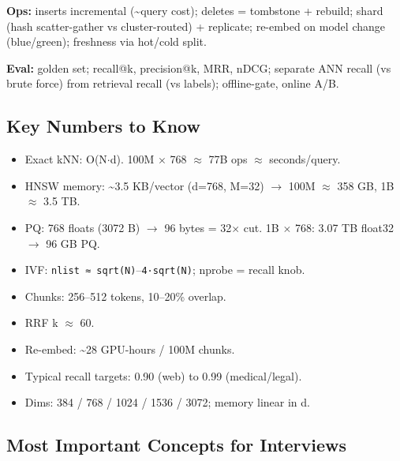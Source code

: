 \documentclass[11pt]{article}
\providecommand{\tightlist}{\setlength{\itemsep}{1pt}\setlength{\parskip}{0pt}}
\begin{document}
\textbf{Ops:} inserts incremental (\textasciitilde query cost); deletes = tombstone + rebuild; shard (hash scatter-gather vs cluster-routed) + replicate; re-embed on model change (blue/green); freshness via hot/cold split.

\textbf{Eval:} golden set; recall@k, precision@k, MRR, nDCG; separate ANN recall (vs brute force) from retrieval recall (vs labels); offline-gate, online A/B.

\subsection{Key Numbers to Know}\label{key-numbers-to-know}

\begin{itemize}
\tightlist
\item
  Exact kNN: O(N\(\cdot\)d). 100M \(\times\) 768 \(\approx\) 77B ops \(\approx\) seconds/query.
\item
  HNSW memory: \textasciitilde3.5 KB/vector (d=768, M=32) \(\rightarrow\) 100M \(\approx\) 358 GB, 1B \(\approx\) 3.5 TB.
\item
  PQ: 768 floats (3072 B) \(\rightarrow\) 96 bytes = 32\(\times\) cut. 1B \(\times\) 768: 3.07 TB float32 \(\rightarrow\) 96 GB PQ.
\item
  IVF: \texttt{nlist\ ≈\ sqrt(N)}--\texttt{4·sqrt(N)}; nprobe = recall knob.
\item
  Chunks: 256--512 tokens, 10--20\% overlap.
\item
  RRF k \(\approx\) 60.
\item
  Re-embed: \textasciitilde28 GPU-hours / 100M chunks.
\item
  Typical recall targets: 0.90 (web) to 0.99 (medical/legal).
\item
  Dims: 384 / 768 / 1024 / 1536 / 3072; memory linear in d.
\end{itemize}

\subsection{Most Important Concepts for Interviews}\label{most-important-concepts-for-interviews}
\end{document}
